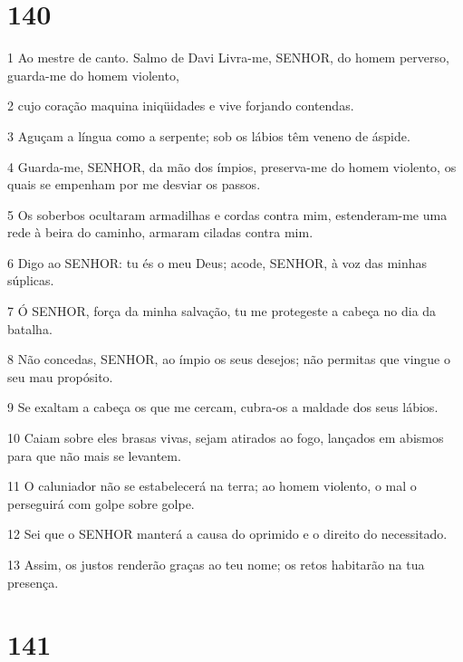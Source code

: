 \chapter{140}

\par 1 Ao mestre de canto. Salmo de Davi Livra-me, SENHOR, do homem perverso, guarda-me do homem violento,
\par 2 cujo coração maquina iniqüidades e vive forjando contendas.
\par 3 Aguçam a língua como a serpente; sob os lábios têm veneno de áspide.
\par 4 Guarda-me, SENHOR, da mão dos ímpios, preserva-me do homem violento, os quais se empenham por me desviar os passos.
\par 5 Os soberbos ocultaram armadilhas e cordas contra mim, estenderam-me uma rede à beira do caminho, armaram ciladas contra mim.
\par 6 Digo ao SENHOR: tu és o meu Deus; acode, SENHOR, à voz das minhas súplicas.
\par 7 Ó SENHOR, força da minha salvação, tu me protegeste a cabeça no dia da batalha.
\par 8 Não concedas, SENHOR, ao ímpio os seus desejos; não permitas que vingue o seu mau propósito.
\par 9 Se exaltam a cabeça os que me cercam, cubra-os a maldade dos seus lábios.
\par 10 Caiam sobre eles brasas vivas, sejam atirados ao fogo, lançados em abismos para que não mais se levantem.
\par 11 O caluniador não se estabelecerá na terra; ao homem violento, o mal o perseguirá com golpe sobre golpe.
\par 12 Sei que o SENHOR manterá a causa do oprimido e o direito do necessitado.
\par 13 Assim, os justos renderão graças ao teu nome; os retos habitarão na tua presença.

\chapter{141}

